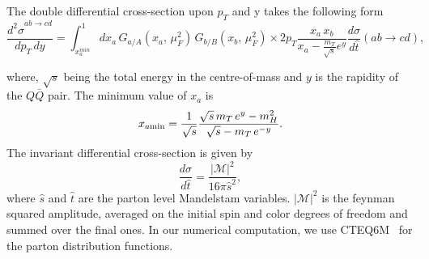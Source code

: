 \documentclass[aps,prc,preprint,superscriptaddress,showpacs,showkeys,amsmath]{revtex4-1}
\begin{document}
The double differential cross-section upon $p_{T}$ and y takes the following form
\begin{equation}
  \frac{{d^{2}\sigma}^{ab\rightarrow cd}}{dp_T\,dy} = \int_{x_{a}^{min}}^{1} dx_a\, G_{a/A}(x_a,\,\mu^{2}_{F})\, G_{b/B}(x_b,\,\mu^{2}_{F})\times 
  2p_T \frac{x_a\,x_b}{x_a-\frac{m_T}{\sqrt{s}}e^y}\frac{d\sigma}{d\hat t}(ab\rightarrow cd),
\end{equation}

where, $\sqrt{s}$ being the total energy in the centre-of-mass and $y$ is the rapidity of 
the $Q\bar Q$ pair. The minimum value of $x_a$ is 
\begin{equation}
x_{a\rm min} = \frac{1}{\sqrt{s}}\frac{\sqrt{s}\,m_T\,e^{y}-m^2_H}{\sqrt{s}-m_T\,e^{-y}}.
\end{equation}
The invariant differential cross-section is given by
\begin{equation}
\frac{d\sigma}{d\hat t} = \frac{|\mathcal{M}|^2}{16\pi{\hat s}^2},
\end{equation}
where $\hat s$ and $\hat t$ are the parton level Mandelstam variables. $|\mathcal{M}|^2$ is the 
feynman squared amplitude, averaged on the initial spin and color degrees of freedom and summed over the
final ones. In our numerical computation, we use CTEQ6M~\cite{Lai:2010vv} for the parton distribution functions. 
\end{document}
